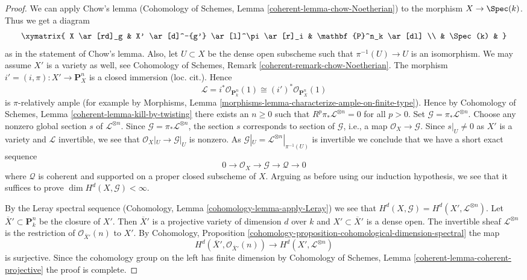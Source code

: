 \begin{proof}
\medskip\noindent
We can apply Chow's lemma
(Cohomology of Schemes, Lemma \ref{coherent-lemma-chow-Noetherian})
to the morphism $X \to \Spec(k)$. Thus we get a diagram
$$
\xymatrix{
X \ar[rd]_g & X' \ar[d]^-{g'} \ar[l]^\pi \ar[r]_i & \mathbf{P}^n_k \ar[dl] \\
& \Spec(k) &
}
$$
as in the statement of Chow's lemma. Also, let $U \subset X$ be
the dense open subscheme such that $\pi^{-1}(U) \to U$ is an isomorphism.
We may assume $X'$ is a variety as well, see
Cohomology of Schemes, Remark \ref{coherent-remark-chow-Noetherian}.
The morphism $i' = (i, \pi) : X' \to \mathbf{P}^n_X$ is
a closed immersion (loc. cit.). Hence
$$
\mathcal{L} = i^*\mathcal{O}_{\mathbf{P}^n_k}(1) \cong
(i')^*\mathcal{O}_{\mathbf{P}^n_X}(1)
$$
is $\pi$-relatively ample (for example by
Morphisms, Lemma \ref{morphisms-lemma-characterize-ample-on-finite-type}).
Hence by Cohomology of Schemes, Lemma \ref{coherent-lemma-kill-by-twisting}
there exists an $n \geq 0$ such that
$R^p\pi_*\mathcal{L}^{\otimes n} = 0$ for all $p > 0$.
Set $\mathcal{G} = \pi_*\mathcal{L}^{\otimes n}$.
Choose any nonzero global section $s$ of $\mathcal{L}^{\otimes n}$.
Since $\mathcal{G} = \pi_*\mathcal{L}^{\otimes n}$, the section $s$
corresponds to section of $\mathcal{G}$, i.e., a map
$\mathcal{O}_X \to \mathcal{G}$.
Since $s|_U \not = 0$ as $X'$ is a variety and $\mathcal{L}$
invertible, we see that $\mathcal{O}_X|_U \to \mathcal{G}|_U$
is nonzero. As $\mathcal{G}|_U = \mathcal{L}^{\otimes n}|_{\pi^{-1}(U)}$
is invertible we conclude that we have a short exact sequence
$$
0 \to \mathcal{O}_X \to \mathcal{G} \to \mathcal{Q} \to 0
$$
where $\mathcal{Q}$ is coherent and supported on a proper
closed subscheme of $X$. Arguing as before using our induction
hypothesis, we see that it
suffices to prove $\dim H^d(X, \mathcal{G}) < \infty$.

\medskip\noindent
By the Leray spectral sequence
(Cohomology, Lemma \ref{cohomology-lemma-apply-Leray})
we see that $H^d(X, \mathcal{G}) = H^d(X', \mathcal{L}^{\otimes n})$.
Let $\overline{X}' \subset \mathbf{P}^n_k$ be the closure
of $X'$. Then $\overline{X}'$ is a projective variety of dimension $d$
over $k$ and $X' \subset \overline{X}'$ is a dense open.
The invertible sheaf $\mathcal{L}^{\otimes n}$ is the restriction of
$\mathcal{O}_{\overline{X}'}(n)$ to $X'$. By
Cohomology, Proposition
\ref{cohomology-proposition-cohomological-dimension-spectral}
the map
$$
H^d(\overline{X}', \mathcal{O}_{\overline{X}'}(n))
\longrightarrow
H^d(X', \mathcal{L}^{\otimes n})
$$
is surjective. Since the cohomology group on the left has
finite dimension by
Cohomology of Schemes, Lemma \ref{coherent-lemma-coherent-projective}
the proof is complete.
\end{proof}

